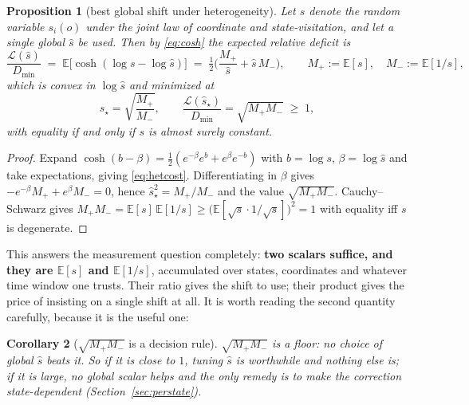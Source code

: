\documentclass[11pt]{article}
\newtheorem{proposition}{Proposition}
\newtheorem{corollary}[proposition]{Corollary}
\theoremstyle{definition}
\newcommand{\E}{\mathbb{E}}
\begin{document}
\begin{proposition}[best global shift under heterogeneity]
\label{prop:hetero}
Let $s$ denote the random variable $s_i(o)$ under the joint law of coordinate and
state-visitation, and let a single global $\hat s$ be used. Then by
\eqref{eq:cosh} the expected relative deficit is
\begin{equation}
  \frac{\mathcal L(\hat s)}{D_{\min}}
  \;=\; \E\big[\cosh(\log s-\log\hat s)\big]
  \;=\; \tfrac12\Big(\frac{M_+}{\hat s}+\hat s\,M_-\Big),
  \qquad
  M_+:=\E[s],\quad M_-:=\E[1/s],
  \label{eq:hetcost}
\end{equation}
which is convex in $\log\hat s$ and minimized at
\begin{equation}
  \boxed{\;
  \hat s_\star=\sqrt{\frac{M_+}{M_-}},
  \qquad
  \frac{\mathcal L(\hat s_\star)}{D_{\min}}=\sqrt{M_+M_-}\;\geq\;1,
  \;}
  \label{eq:hetopt}
\end{equation}
with equality if and only if $s$ is almost surely constant.
\end{proposition}

\begin{proof}
Expand $\cosh(b-\beta)=\tfrac12(e^{-\beta}e^{b}+e^{\beta}e^{-b})$ with
$b=\log s$, $\beta=\log\hat s$ and take expectations, giving \eqref{eq:hetcost}.
Differentiating in $\beta$ gives $-e^{-\beta}M_++e^{\beta}M_-=0$, hence
$\hat s_\star^2=M_+/M_-$ and the value $\sqrt{M_+M_-}$. Cauchy--Schwarz gives
$M_+M_-=\E[s]\,\E[1/s]\ge\big(\E[\sqrt s\cdot1/\sqrt s]\big)^2=1$ with equality
iff $s$ is degenerate.
\end{proof}

This answers the measurement question completely: \textbf{two scalars suffice,
and they are $\E[s]$ and $\E[1/s]$}, accumulated over states, coordinates and
whatever time window one trusts. Their ratio gives the shift to use; their
product gives the price of insisting on a single shift at all. It is worth
reading the second quantity carefully, because it is the useful one:

\begin{corollary}[$\sqrt{M_+M_-}$ is a decision rule]
\label{cor:decide}
$\sqrt{M_+M_-}$ is a floor: no choice of global $\hat s$ beats it. So if it is
close to $1$, tuning $\hat s$ is worthwhile and nothing else is; if it is large,
\emph{no} global scalar helps and the only remedy is to make the correction
state-dependent (Section~\ref{sec:perstate}).
\end{corollary}
\end{document}

